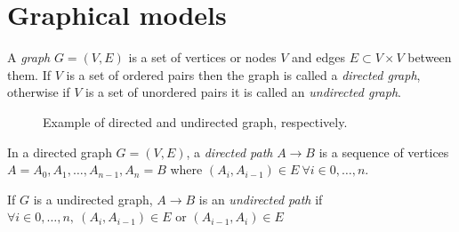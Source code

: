 \documentclass[oneside,openright,titlepage,numbers=noenddot,openany,headinclude,footinclude=true,
  cleardoublepage=empty,abstractoff,BCOR=5mm,paper=a4,fontsize=12pt]{scrreprt}
\begin{document}
\begin{definition}
\end{definition}


\chapter{Graphical models}

\begin{definition}
A \emph{graph} \(G = (V,E)\) is a set of vertices or nodes \(V\) and edges \(E\subset
V\times V\) between them.
If \(V\) is a set of ordered pairs then the graph is called a \emph{directed
  graph}, otherwise if \(V\) is a set of unordered pairs it is called an \emph{undirected graph}.
\end{definition}

\begin{figure*}[h]
\centering
{}
\caption{Example of directed and undirected graph, respectively.}
\label{fig:graphs}
\end{figure*}

\begin{definition}
In a directed graph \(G = (V, E)\), a \emph{directed path} \(A \to B\) is a sequence of vertices \({A = A_0,
  A_1,\dots,A_{n-1}, A_n = B}\) where \((A_i, A_{i-1}) \in E \ \forall i \in
0,\dots ,n\).

If \(G\) is a undirected graph, \(A \to B\) is an \emph{undirected path} if \(\forall i \in
0,\dots, n, \ (A_i, A_{i-1}) \in E\) or  \((A_{i-1}, A_{i}) \in E\)
\end{definition}
\end{document}
